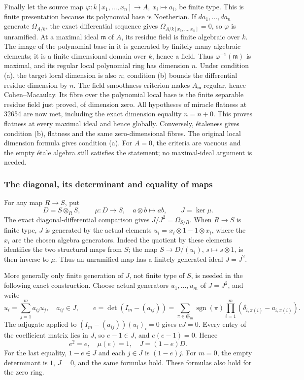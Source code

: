 Finally let the source map \(\varphi:k[x_1,\ldots,x_n]\to A,\ x_i\mapsto a_i\), be finite type. This is finite presentation because its polynomial base is Noetherian. If \(da_1,\ldots,da_n\) generate \(\Omega_{A/k}\), the exact differential sequence gives \(\Omega_{A/k[x_1,\ldots,x_n]}=0\), so \(\varphi\) is unramified. At a maximal ideal \(\mathfrak m\) of \(A\), its residue field is finite algebraic over \(k\). The image of the polynomial base in it is generated by finitely many algebraic elements; it is a finite dimensional domain over \(k\), hence a field. Thus \(\varphi^{-1}(\mathfrak m)\) is maximal, and its regular local polynomial ring has dimension \(n\). Under condition (a), the target local dimension is also \(n\); condition (b) bounds the differential residue dimension by \(n\). The field smoothness criterion makes \(A_{\mathfrak m}\) regular, hence Cohen--Macaulay. Its fibre over the polynomial local base is the finite separable residue field just proved, of dimension zero. All hypotheses of miracle flatness at 32654 are now met, including the exact dimension equality \(n=n+0\). This proves flatness at every maximal ideal and hence globally. Conversely, étaleness gives condition (b), flatness and the same zero-dimensional fibres. The original local dimension formula gives condition (a). For \(A=0\), the criteria are vacuous and the empty étale algebra still satisfies the statement; no maximal-ideal argument is needed.

\subsubsection{The diagonal, its determinant and equality of maps}\label{the-diagonal-its-determinant-and-equality-of-maps}

For any map \(R\to S\), put \[
D=S\otimes_RS,\qquad \mu:D\to S,\quad a\otimes b\mapsto ab,\qquad
J=\ker\mu.
\] The exact diagonal-differential comparison gives \(J/J^2=\Omega_{S/R}\). When \(R\to S\) is finite type, \(J\) is generated by the actual elements \(u_i=x_i\otimes1-1\otimes x_i\), where the \(x_i\) are the chosen algebra generators. Indeed the quotient by these elements identifies the two structural maps from \(S\); the map \(S\to D/(u_i)\), \(s\mapsto s\otimes1\), is then inverse to \(\mu\). Thus an unramified map has a finitely generated ideal \(J=J^2\).

More generally only finite generation of \(J\), not finite type of \(S\), is needed in the following exact construction. Choose actual generators \(u_1,\ldots,u_m\) of \(J=J^2\), and write \[
u_i=\sum_{j=1}^m a_{ij}u_j,\quad a_{ij}\in J,\qquad
e=\det(I_m-(a_{ij}))
=\sum_{\pi\in\mathfrak S_m}\operatorname{sgn}(\pi)
\prod_{i=1}^m(\delta_{i,\pi(i)}-a_{i,\pi(i)}).
\tag{UR-1}
\] The adjugate applied to \((I_m-(a_{ij}))(u_i)_i=0\) gives \(eJ=0\). Every entry of the coefficient matrix lies in \(J\), so \(e-1\in J\), and \(e(e-1)=0\). Hence \[
e^2=e,\quad \mu(e)=1,\quad J=(1-e)D.
\tag{UR-2}
\] For the last equality, \(1-e\in J\) and each \(j\in J\) is \((1-e)j\). For \(m=0\), the empty determinant is \(1\), \(J=0\), and the same formulas hold. These formulas also hold for the zero ring.

